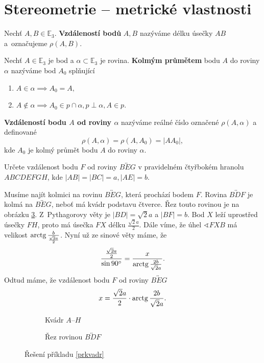 \section{Stereometrie -- metrické vlastnosti}
\begin{definition}
    Nechť $A, B \in \mathbb E_3.$ \textbf{Vzdáleností bodů} $A,B$ nazýváme délku
    úsečky $AB$ a~označujeme $\rho(A,B).$
\end{definition}

\begin{definition}
    Nechť $A\in \mathbb E_3$ je bod a $\alpha \subset \mathbb E_3$ je rovina.
    \textbf{Kolmým průmětem} bodu $A$ do roviny $\alpha$ nazýváme bod $A_0$
    splňující
    \begin{enumerate}[$i.$]
    \item $A\in \alpha \implies A_0=A,$
   	\item $A\notin \alpha \implies A_0 \in p\cap \alpha, p \perp\alpha, A \in p.$
    \end{enumerate}
    \textbf{Vzdáleností bodu $A$ od roviny $\alpha$} nazýváme reálné číslo označené
    $\rho(A,\alpha) $ a definované
    $$\rho(A,\alpha) = \rho(A, A_0) = |AA_0|,$$
    kde $A_0$ je kolmý průmět bodu $A$ do roviny $\alpha.$
\end{definition}

\begin{priklad}\label{prkvadr}
Určete vzdálenost bodu $F$ od roviny $\overleftrightarrow{BEG}$ v pravidelném
čtyřbokém hranolu $ABCDEFGH$, kde $|AB|=|BC|=a, |AE|=b$.
\end{priklad}

\begin{reseni}
Musíme najít kolmici na rovinu $\overleftrightarrow{BEG}$, která prochází bodem $F$. Rovina $\overleftrightarrow{BDF}$
je kolmá na $\overleftrightarrow{BEG}$, neboť má kvádr podstavu čtverce. Řez touto rovinou je na obrázku
\ref{prrez}. Z~Pythagorovy věty je $|BD| = \sqrt{2}a$ a $|BF|=b$. Bod $X$ leží uprostřed úsečky $FH$,
proto má úsečka $FX$ délku $\frac{\sqrt{2}a }{2}$. Dále víme, že úhel $\sphericalangle FXB$ má velikost
$\operatorname{arctg} \frac{b}{\frac{\sqrt{2}a }{2}}$. Nyní už ze sinové věty máme, že
$$
\frac{\frac{\sqrt{2}a }{2}}{\sin 90^\circ} = \frac{x}{\operatorname{arctg} \frac{2b}{\sqrt{2}a}}.
$$
Odtud máme, že vzdálenost bodu $F$ od roviny $\overleftrightarrow{BEG}$
$$
x= \frac{\sqrt{2}a }{2} \cdot \operatorname{arctg} \frac{2b}{\sqrt{2}a}.
$$
\begin{figure}[h]
\begin{subfigure}{.5\textwidth}
    \centering
	\caption{Kvádr $A$--$H$}
	\label{fig:label}
\end{subfigure}
\begin{subfigure}{.5\textwidth}
	\centering
	\caption{Řez rovinou $\overleftrightarrow{BDF}$}
	\label{prrez}
\end{subfigure}
\caption{Řešení příkladu \ref{prkvadr}}
\end{figure}
\end{reseni}


